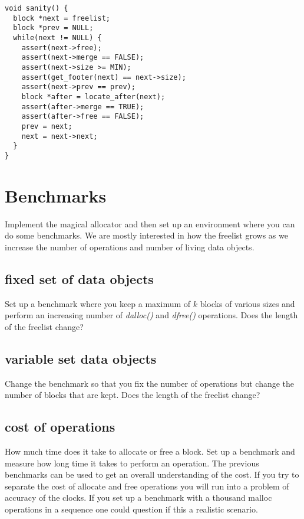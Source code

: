 \documentclass[a4paper,11pt]{article}
\begin{document}
 \begin{lstlisting}
void sanity() {
  block *next = freelist;
  block *prev = NULL;
  while(next != NULL) {
    assert(next->free);
    assert(next->merge == FALSE);    
    assert(next->size >= MIN);
    assert(get_footer(next) == next->size);
    assert(next->prev == prev);
    block *after = locate_after(next);
    assert(after->merge == TRUE);
    assert(after->free == FALSE);
    prev = next;
    next = next->next;
  }
}
 \end{lstlisting}

 
 \section{Benchmarks}

 Implement the magical allocator and then set up an environment where
 you can do some benchmarks. We are mostly interested in how the
 freelist grows as we increase the number of operations and number of
 living data objects. 

 \subsection{fixed set of data objects}

 Set up a benchmark where you keep a maximum of $k$ blocks of various
 sizes and perform an increasing number of {\em dalloc()} and {\em
 dfree()} operations. Does the length of the freelist change?

\subsection{variable set data objects}

Change the benchmark so that you fix the number of operations but
change the number of blocks that are kept. Does the length of the
freelist change?

\subsection{cost of operations}

How much time does it take to allocate or free a block. Set up a
benchmark and measure how long time it takes to perform an
operation. The previous benchmarks can be used to get an overall
understanding of the cost. If you try to separate the cost of allocate
and free operations you will run into a problem of accuracy of the
clocks. If you set up a benchmark with a thousand malloc operations in
a sequence one could question if this a realistic scenario. 
  
\end{document}
